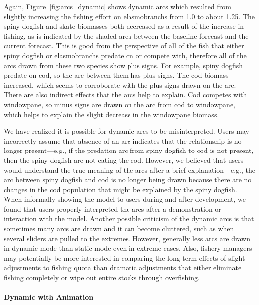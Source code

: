 Again, Figure~\ref{fig:arcs_dynamic} shows dynamic arcs which resulted from slightly increasing the fishing effort on elasmobranchs from 1.0 to about 1.25.  The spiny dogfish and skate biomasses both decreased as a result of the increase in fishing, as is indicated by the shaded area between the baseline forecast and the current forecast.  This is good from the perspective of all of the fish that either spiny dogfish or elasmobranchs predate on or compete with, therefore all of the arcs drawn from these two species show plus signs.  For example, spiny dogfish predate on cod, so the arc between them has plus signs.  The cod biomass increased, which seems to corroborate with the plus signs drawn on the arc.  There are also indirect effects that the arcs help to explain.  Cod competes with windowpane, so minus signs are drawn on the arc from cod to windowpane, which helps to explain the slight decrease in the windowpane biomass.

We have realized it is possible for dynamic arcs to be misinterpreted.  Users may incorrectly assume that absence of an arc indicates that the relationship is no longer present---e.g., if the predation arc from spiny dogfish to cod is not present, then the spiny dogfish are not eating the cod.  However, we believed that users would understand the true meaning of the arcs after a brief explanation---e.g., the arc between spiny dogfish and cod is no longer being drawn because there are no changes in the cod population that might be explained by the spiny dogfish.  When informally showing the model to users during and after development, we found that users properly interpreted the arcs after a demonstration or interaction with the model.  Another possible criticism of the dynamic arcs is that sometimes many arcs are drawn and it can become cluttered, such as when several sliders are pulled to the extremes.  However, generally less arcs are drawn in dynamic mode than static mode even in extreme cases.  Also, fishery managers may potentially be more interested in comparing the long-term effects of slight adjustments to fishing quota than dramatic adjustments that either eliminate fishing completely or wipe out entire stocks through overfishing.

\paragraph{Dynamic with Animation}

